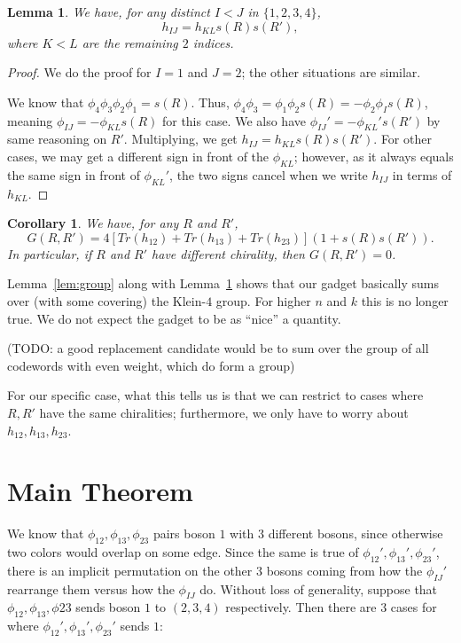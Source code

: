 \documentclass[12pt,twoside,singlespace]{amsart}
\numberwithin{equation}{section}
\newtheorem{lem}[equation]{Lemma}
\newtheorem{cor}[equation]{Corollary}
\theoremstyle{definition}
\begin{document}
\begin{lem}
\label{lem:cover}
We have, for any distinct $I < J$ in $\{1,2,3,4\}$, 
\[
h_{IJ} = h_{KL} s(R)s(R'),
\]
where $K < L$ are the remaining $2$ indices.
\end{lem}
\begin{proof}
We do the proof for $I = 1$ and $J=2$; the other situations are similar.

We know that $\phi_4\phi_3\phi_2\phi_1 = s(R)$. Thus, $\phi_4\phi_3 = \phi_1\phi_2 s(R) = - \phi_2 \phi_I s(R)$, meaning $\phi_{IJ} = - \phi_{KL} s(R)$ for this case. We also have $\phi_{IJ}' = - \phi_{KL}' s(R')$ by same reasoning on $R'$. Multiplying, we get $h_{IJ} = h_{KL} s(R)s(R')$. For other cases, we may get a different sign in front of the $\phi_{KL}$; however, as it always equals the same sign in front of $\phi_{KL}'$, the two signs cancel when we write $h_{IJ}$ in terms of $h_{KL}$.
\end{proof}

\begin{cor}
\label{cor:twofold}
We have, for any $R$ and $R'$,
\[
G(R,R') = 4[Tr(h_{12}) + Tr(h_{13}) + Tr(h_{23})](1 + s(R)s(R')).
\]
In particular, if $R$ and $R'$ have different chirality, then $G(R,R') = 0$.
\end{cor}

Lemma~\ref{lem:group} along with Lemma~\ref{lem:cover} shows that our gadget basically sums over (with some covering) the Klein-$4$ group. For higher $n$ and $k$ this is no longer true. We do not expect the gadget to be as ``nice'' a quantity.

(TODO: a good replacement candidate would be to sum over the group of all codewords with even weight, which do form a group)

For our specific case, what this tells us is that we can restrict to cases where $R,R'$ have the same chiralities; furthermore, we only have to worry about $h_{12}, h_{13}, h_{23}$.

\section{Main Theorem}

We know that $\phi_{12}, \phi_{13}, \phi_{23}$ pairs boson $1$ with $3$ different bosons, since otherwise two colors would overlap on some edge. Since the same is true of $\phi_{12}', \phi_{13}', \phi_{23}'$, there is an implicit permutation on the other $3$ bosons coming from how the $\phi_{IJ}'$ rearrange them versus how the $\phi_{IJ}$ do. Without loss of generality, suppose that $\phi_{12}, \phi_{13}, \phi{23}$ sends boson $1$ to $(2,3,4)$ respectively. Then there are $3$ cases for where $\phi_{12}', \phi_{13}', \phi_{23}'$ sends $1$:
\end{document}

